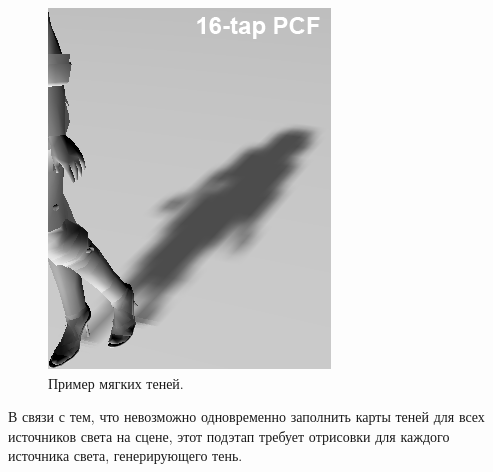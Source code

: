 		 \begin{figure}[ht!] 
		 	\center
		 	\includegraphics [scale=1] {my_folder/images//pcf_shadows}	
		 	\caption{Пример мягких теней.} 
		 	\label{fig:pcf_shadows}
		 \end{figure}
		 
		 В связи с тем, что невозможно одновременно заполнить карты теней для всех источников света на сцене, этот подэтап требует отрисовки для каждого источника света, генерирующего тень.